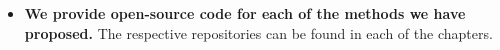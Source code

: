 \begin{itemize}
      \item \textbf{We provide open-source code for each of the
                  methods we have proposed.}
            The respective repositories can be found in each
            of the chapters.


\end{itemize}


